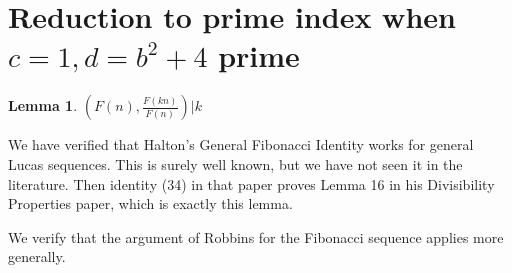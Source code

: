 \documentclass[12pt]{article}
\newtheorem{lem}[thm]{Lemma}
\newenvironment{proof}[1][Proof.]{\begin{trivlist}
\item[\hskip \labelsep {\bfseries #1}]}{\end{trivlist}}
\begin{document}
\section{Reduction to prime index when $c = 1, d = b^2+4$ prime}

\begin{lem}
$(F(n), \frac{F(kn)}{F(n)}) | k$
\end{lem}
\begin{proof}
We have verified that Halton's General Fibonacci Identity works for general Lucas sequences. This is surely well known, but we have not seen it in the literature. Then identity (34) in that paper proves Lemma 16 in his Divisibility Properties paper, which is exactly this lemma.
\end{proof}


We verify that the argument of Robbins for the Fibonacci sequence applies more generally.
\end{document}

